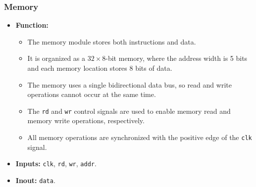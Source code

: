 \subsubsection*{Memory}
\begin{itemize}
	\item \textbf{Function:}
	      \begin{itemize}
		      \item The memory module stores both instructions and data.
		      \item It is organized as a \(32 \times 8\)-bit memory, where the address width is 5 bits and each memory location stores 8 bits of data.
		      \item The memory uses a single bidirectional data bus, so read and write operations cannot occur at the same time.
		      \item The \texttt{rd} and \texttt{wr} control signals are used to enable memory read and memory write operations, respectively.
		      \item All memory operations are synchronized with the positive edge of the \texttt{clk} signal.
	      \end{itemize}
	\item \textbf{Inputs:} \texttt{clk}, \texttt{rd}, \texttt{wr}, \texttt{addr}.
	\item \textbf{Inout:} \texttt{data}.
\end{itemize}
